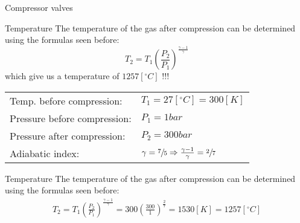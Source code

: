 \documentclass[aspectratio=1610,english,12pt]{beamer}
\begin{document}
	\begin{frame}{Compressor valves}
	\end{frame}

	\begin{frame}{Temperature}
		The temperature of the gas after compression can be determined using the formulas seen before:
			\[ \boxed{T_2 = T_1 \left( \frac{P_2}{P_1} \right) ^{\frac{\gamma-1}{\gamma}}} \]
		which give us a temperature of $1257 [^{\circ}C]$ !!!\par
		\vfill		
		\begin{tabularx}{\linewidth}{X l}
			Temp. before compression: & $T_1 = 27 [^{\circ}C]=300[K]$\\
			Pressure before compression: & $P_1 = 1 bar$\\
			Pressure after compression: & $P_2 = 300 bar$ \\
			Adiabatic index: & $\gamma = \sfrac{7}{5} \Rightarrow {\frac{\gamma-1}{\gamma}}=\sfrac{2}{7}$
		\end{tabularx}
	\end{frame}

	\begin{frame}{Temperature}
		The temperature of the gas after compression can be determined using the formulas seen before:
		\begin{align*}
			T_2 	= T_1 \left( \frac{P_2}{P_1} \right) ^{\frac{\gamma-1}{\gamma}}
					= 300 \left( \frac{300}{1} \right) ^{\frac{2}{7}}
					= 1530 [K]
					= 1257 [^{\circ}C]
		\end{align*}
	\end{frame}
\end{document}
